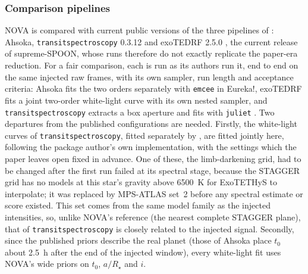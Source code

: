 \subsubsection{Comparison pipelines}
\label{sec:comparison}

NOVA is compared with current public versions of the three pipelines of
\citet{LouieEtAl2025}: Ahsoka, \texttt{transitspectroscopy} 0.3.12
\citep{Espinoza2022TransitSpectroscopy} and exoTEDRF 2.5.0
\citep{Radica2024}, the current release of supreme-SPOON, whose runs therefore
do not exactly replicate the paper-era reduction. For a fair comparison, each
is run as its authors run it, end to end on the same
injected raw frames, with its own sampler, run length and acceptance
criteria: Ahsoka fits the two orders separately with \texttt{emcee} in
Eureka!, exoTEDRF fits a joint two-order white-light curve with its own
nested sampler, and \texttt{transitspectroscopy} extracts a box aperture and
fits with \texttt{juliet} \citep{EspinozaEtAl2019}. Two departures from the
published configurations are needed. Firstly, the white-light curves of
\texttt{transitspectroscopy}, fitted separately by \citet{LouieEtAl2025}, are
fitted jointly here, following the package author's own implementation, with
the settings which the paper leaves open fixed in advance. One of these, the
limb-darkening grid, had to be changed after the first run failed at its
spectral stage, because the STAGGER grid has no models at this star's
gravity above 6500~K for ExoTETHyS to interpolate; it was replaced by
MPS-ATLAS set~2 before any spectral estimate or score existed. This set comes
from the same model family as the injected intensities, so, unlike NOVA's
reference (the nearest complete STAGGER plane), that of
\texttt{transitspectroscopy} is closely related to the injected signal. Secondly, since the published priors describe the real planet (those of
Ahsoka place $t_0$ about 2.5~h after the end of the injected window), every
white-light fit uses NOVA's wide priors on $t_0$, $a/R_\star$ and $i$.

